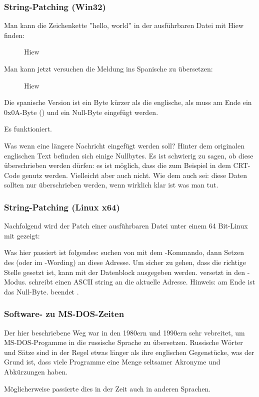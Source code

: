 \subsubsection{String-Patching (Win32)}

Man kann die Zeichenkette ''hello, world'' in der ausführbaren Datei mit Hiew finden:

\begin{figure}[H]
\centering
{}
\caption{Hiew}
\label{}
\end{figure}

Man kann jetzt versuchen die Meldung ins Spanische zu übersetzen:

\begin{figure}[H]
\centering
{}
\caption{Hiew}
\label{}
\end{figure}

Die spanische Version ist ein Byte kürzer als die englische, als muss am Ende ein 0x0A-Byte () und ein Null-Byte eingefügt werden.

Es funktioniert.

Was wenn eine längere Nachricht eingefügt werden soll?
Hinter dem originalen englischen Text befinden sich einige Nullbytes.
Es ist schwierig zu sagen, ob diese überschrieben werden dürfen: es ist möglich, dass die zum Beispiel in dem \ac{CRT}-Code genutz werden. Vielleicht aber auch nicht.
Wie dem auch sei: diese Daten sollten nur überschrieben werden, wenn wirklich klar ist was man tut.

\subsubsection{String-Patching (Linux x64)}

\myindex{\radare}
Nachfolgend wird der Patch einer ausführbaren Datei unter einem 64 Bit-Linux mit \radare gezeigt:



Was hier passiert ist folgendes: suchen von  mit dem \TT{/}-Kommando,
dann Setzen des  (oder  im \radare-Wording) an diese Adresse.
Um sicher zu gehen, dass die richtige Stelle gesetzt ist, kann mit  der Datenblock ausgegeben werden.
 versetzt \radare in den -Modus.
 schreibt einen ASCII string an die aktuelle Adresse.
Hinweis:  am Ende ist das Null-Byte.
 beendet \radare.

\subsubsection{Software- zu MS-DOS-Zeiten}

Der hier beschriebene Weg war in den 1980ern und  1990ern sehr vebreitet, um MS-DOS-Progamme in die russische Sprache zu übersetzen.
Russische Wörter und Sätze sind in der Regel etwas länger als ihre englischen Gegenstücke, was der Grund ist, dass
viele  Programme eine Menge seltsamer Akronyme und Abkürzungen haben.

Möglicherweise passierte dies in der Zeit auch in anderen Sprachen.
